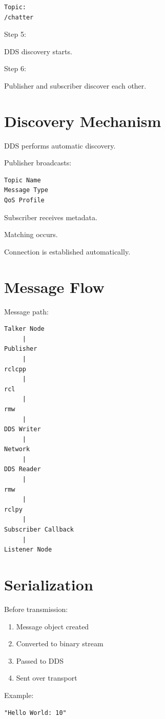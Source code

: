 \documentclass[11pt]{article}
\begin{document}
\begin{verbatim}
Topic:
/chatter
\end{verbatim}

Step 5:

DDS discovery starts.

Step 6:

Publisher and subscriber discover each other.

\section{Discovery Mechanism}

DDS performs automatic discovery.

Publisher broadcasts:

\begin{verbatim}
Topic Name
Message Type
QoS Profile
\end{verbatim}

Subscriber receives metadata.

Matching occurs.

Connection is established automatically.

\section{Message Flow}

Message path:

\begin{verbatim}
Talker Node
     |
Publisher
     |
rclcpp
     |
rcl
     |
rmw
     |
DDS Writer
     |
Network
     |
DDS Reader
     |
rmw
     |
rclpy
     |
Subscriber Callback
     |
Listener Node
\end{verbatim}

\section{Serialization}

Before transmission:

\begin{enumerate}
\item Message object created
\item Converted to binary stream
\item Passed to DDS
\item Sent over transport
\end{enumerate}

Example:

\begin{verbatim}
"Hello World: 10"
\end{verbatim}
\end{document}
